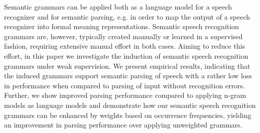 Semantic grammars can be applied both as a language model for a speech recognizer and for semantic parsing, e.g. in order to map the output of a speech recognizer into formal meaning representations. Semantic speech recognition grammars are, however, typically created manually or learned in a supervised fashion, requiring extensive manual effort in both cases. Aiming to reduce this effort, in this paper we investigate the induction of semantic speech recognition grammars under weak supervision. We present empirical results, indicating that the induced grammars support semantic parsing of speech with a rather low loss in performance when compared to parsing of input without recognition errors. Further, we show improved parsing performance compared to applying n-gram models as language models and demonstrate how our semantic speech recognition grammars can be enhanced by weights based on occurrence frequencies, yielding an improvement in parsing performance over applying unweighted grammars.
